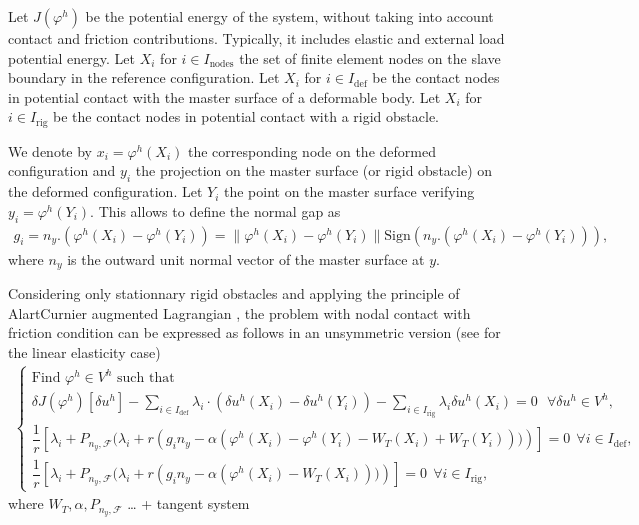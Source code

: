\documentclass[a4paper,11pt,english]{sphinxmanual}
\begin{document}
Let \(J(\varphi^h)\) be the potential energy of the system, without taking into account contact and friction contributions. Typically, it includes elastic and external load potential energy. Let \(X_i\) for  \(i \in I_{\text{nodes}}\) the set of finite element nodes on the slave boundary in the reference configuration. Let \(X_i\) for  \(i \in I_{\text{def}}\) be the contact nodes in potential contact with the master surface of a deformable body. Let  \(X_i\) for  \(i \in I_{\text{rig}}\) be the contact nodes in potential contact with a rigid obstacle.

We denote by \(x_i = \varphi^h(X_i)\) the corresponding node on the deformed configuration and \(y_i\) the projection on the master surface (or rigid obstacle) on the deformed configuration. Let \(Y_i\) the point on the master surface verifying \(y_i = \varphi^h(Y_i)\). This allows to define the normal gap as
\begin{equation*}
\begin{split}g_i = n_y . (\varphi^h(X_i) - \varphi^h(Y_i)) = \|\varphi^h(X_i) - \varphi^h(Y_i)\| \text{Sign}(n_y . (\varphi^h(X_i) - \varphi^h(Y_i))),\end{split}
\end{equation*}
where \(n_y\) is the outward unit normal vector of the master surface at \(y\).

Considering only stationnary rigid obstacles and applying the principle of Alart\sphinxhyphen{}Curnier augmented Lagrangian , the problem with nodal contact with friction condition can be expressed as follows in an unsymmetric version (see  for the linear elasticity case)
\begin{equation*}
\begin{split}\left\{\begin{array}{l}
\mbox{Find } \varphi^h \in V^h \mbox{ such that } \\
\displaystyle \delta J(\varphi^h)[\delta u^h] - \sum_{i \in I_{\text{def}}} \lambda_i \cdot (\delta u^h(X_i) - \delta u^h(Y_i)) - \sum_{i \in I_{\text{rig}}} \lambda_i \delta u^h(X_i) = 0 ~~~ \forall \delta u^h \in V^h, \\
\displaystyle \dfrac{1}{r} \left[\lambda_i + P_{n_y, {\mathscr F}}(\lambda_i + r\left(g_i n_y - \alpha(\varphi^h(X_i) - \varphi^h(Y_i) - W_T(X_i)+W_T(Y_i)))\right)\right]= 0  ~~\forall i \in I_{\text{def}}, \\[1em]
\displaystyle \dfrac{1}{r} \left[\lambda_i + P_{n_y, {\mathscr F}}(\lambda_i + r\left(g_i n_y - \alpha(\varphi^h(X_i) - W_T(X_i)))\right)\right]= 0  ~~\forall i \in I_{\text{rig}},
\end{array}\right.\end{split}
\end{equation*}
where \(W_T, \alpha, P_{n_y, {\mathscr F}}\) … + tangent system
\end{document}
